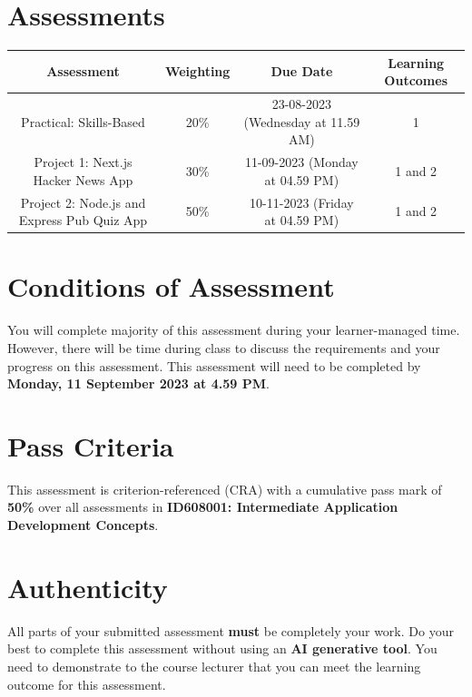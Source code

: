 \documentclass{article}
\begin{document}
\section*{Assessments}
\renewcommand{\arraystretch}{1.5}
\begin{tabular}{|c|c|c|c|}
	\hline
	\textbf{Assessment}                                 & \textbf{Weighting} & \textbf{Due Date}            & \textbf{Learning Outcomes} \\ \hline
	\small Practical: Skills-Based & \small 20\%        & \small 23-08-2023 (Wednesday at 11.59 AM)   & \small 1                   \\ \hline
	\small Project 1: Next.js Hacker News App             & \small 30\%        & \small 11-09-2023 (Monday at 04.59 PM)  & \small 1 and 2                   \\ \hline
	\small Project 2: Node.js and Express Pub Quiz App                       & \small 50\%        & \small 10-11-2023 (Friday at 04.59 PM)  & \small 1 and 2                   \\ \hline
\end{tabular}

\section*{Conditions of Assessment}
You will complete majority of this assessment during your learner-managed time. However, there will be time during class to discuss the requirements and your progress on this assessment. This assessment will need to be completed by \textbf{Monday, 11 September 2023 at 4.59 PM}.

\section*{Pass Criteria}
This assessment is criterion-referenced (CRA) with a cumulative pass mark of \textbf{50\%} over all assessments in \textbf{ID608001: Intermediate Application Development Concepts}.

\section*{Authenticity}
All parts of your submitted assessment \textbf{must} be completely your work. Do your best to complete this assessment without using an \textbf{AI generative tool}. You need to demonstrate to the course lecturer that you can meet the learning outcome for this assessment. \\
 
\end{document}
